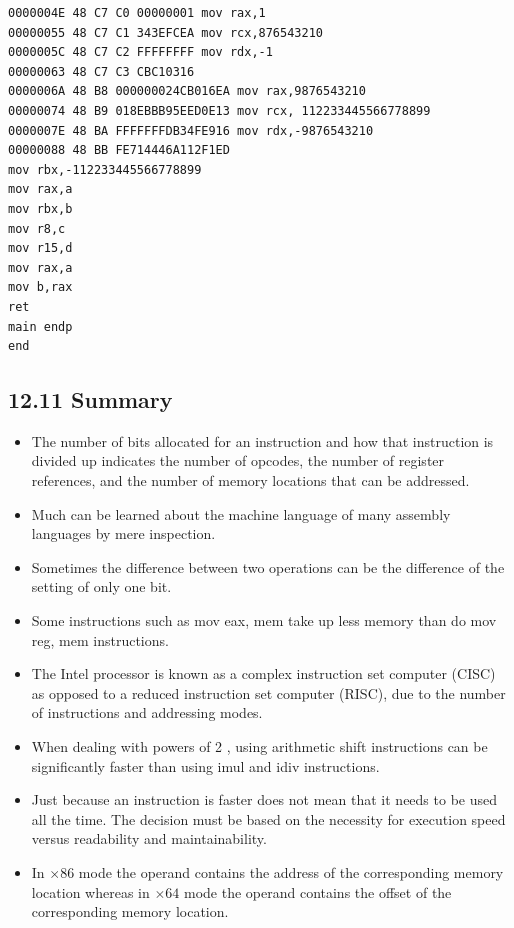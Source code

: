 \documentclass[10pt]{article}
\begin{document}
\begin{verbatim}
0000004E 48 C7 C0 00000001 mov rax,1
00000055 48 C7 C1 343EFCEA mov rcx,876543210
0000005C 48 C7 C2 FFFFFFFF mov rdx,-1
00000063 48 C7 C3 CBC10316
0000006A 48 B8 000000024CB016EA mov rax,9876543210
00000074 48 B9 018EBBB95EED0E13 mov rcx, 112233445566778899
0000007E 48 BA FFFFFFFDB34FE916 mov rdx,-9876543210
00000088 48 BB FE714446A112F1ED
mov rbx,-112233445566778899
mov rax,a
mov rbx,b
mov r8,c
mov r15,d
mov rax,a
mov b,rax
ret
main endp
end
\end{verbatim}

\subsection*{12.11 Summary}
\begin{itemize}
  \item The number of bits allocated for an instruction and how that instruction is divided up indicates the number of opcodes, the number of register references, and the number of memory locations that can be addressed.
  \item Much can be learned about the machine language of many assembly languages by mere inspection.
  \item Sometimes the difference between two operations can be the difference of the setting of only one bit.
  \item Some instructions such as mov eax, mem take up less memory than do mov reg, mem instructions.
  \item The Intel processor is known as a complex instruction set computer (CISC) as opposed to a reduced instruction set computer (RISC), due to the number of instructions and addressing modes.
  \item When dealing with powers of 2 , using arithmetic shift instructions can be significantly faster than using imul and idiv instructions.
  \item Just because an instruction is faster does not mean that it needs to be used all the time. The decision must be based on the necessity for execution speed versus readability and maintainability.
  \item In $\times 86$ mode the operand contains the address of the corresponding memory location whereas in $\times 64$ mode the operand contains the offset of the corresponding memory location.
\end{itemize}
\end{document}
